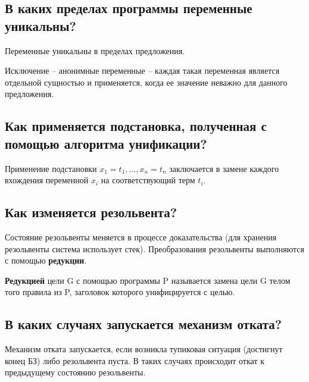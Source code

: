 \documentclass[a4paper,12pt]{article}
\begin{document}
	

	\subsection*{В каких пределах программы переменные уникальны? }

	

	Переменные уникальны в пределах предложения.

	

	Исключение – анонимные переменные – каждая такая переменная является отдельной сущностью и применяется, когда ее значение неважно для данного предложения.

	

	\subsection*{Как применяется подстановка, полученная с помощью алгоритма унификации?}

	

	Применение подстановки ${x_1=t_1, …, x_n=t_n}$ заключается в замене каждого вхождения переменной $x_i$ на соответствующий терм $t_i$.

	

	\subsection*{Как изменяется резольвента?}

	

	Состояние резольвенты меняется в процессе доказательства (для хранения резольвенты система использует стек). Преобразования резольвенты выполняются с помощью {\bf редукции}.

	

	{\bf Редукцией} цели G с помощью программы P называется замена цели G телом того правила из P, заголовок которого унифицируется с целью.

	

	\subsection*{В каких случаях запускается механизм отката?}
	
	Механизм отката запускается, если возникла тупиковая ситуация (достигнут конец БЗ) либо резольвента пуста. В таких случаях происходит откат к предыдущему состоянию резольвенты.
	
\end{document}
